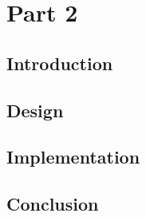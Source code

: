 \documentclass{article}
\begin{document}


\section{Part 2}\label{sec:02_part2}

\subsection{Introduction}\label{subsec:02_part2_intro}

\subsection{Design}\label{subsec:02_part2_design}

\subsection{Implementation}\label{subsec:02_part2_impl}

\subsection{Conclusion}\label{subsec:02_part2_concl}



\end{document}
